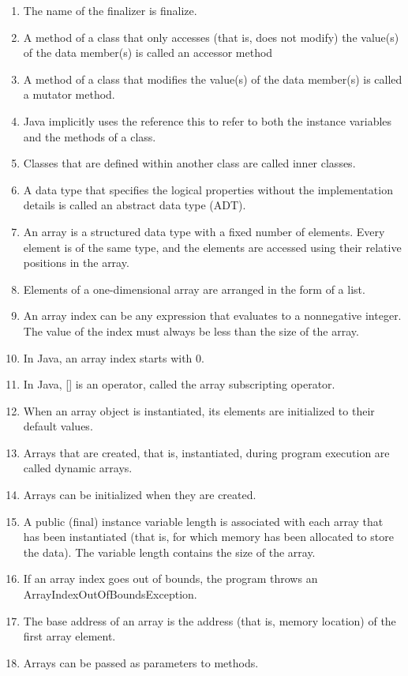 \documentclass[12pt,a4paper,final,twoside,onecolumn,titlepage]{book}
\begin{document}
\begin{enumerate}
\item The name of the finalizer is finalize.
\item A method of a class that only accesses (that is, does not modify) the value(s) of the data member(s) is called an accessor method
\item A method of a class that modifies the value(s) of the data member(s) is called a mutator method.
\item  Java implicitly uses the reference this to refer to both the instance variables and the methods of a class.
\item Classes that are defined within another class are called inner classes.
\item A data type that specifies the logical properties without the implementation details is called an abstract data type (ADT).
\item An array is a structured data type with a fixed number of elements. Every element is of the same type, and the elements are accessed using their relative positions in the array.
\item Elements of a one-dimensional array are arranged in the form of a list.
\item An array index can be any expression that evaluates to a nonnegative integer. The value of the index must always be less than the size of the array.
\item In Java, an array index starts with 0.
\item In Java, [] is an operator, called the array subscripting operator.
\item When an array object is instantiated, its elements are initialized to their default values.
\item Arrays that are created, that is, instantiated, during program execution are called dynamic arrays.
\item Arrays can be initialized when they are created.
\item A public (final) instance variable length is associated with each array that has been instantiated (that is, for which memory has been allocated to store the data). The variable length contains the size of the array.
\item If an array index goes out of bounds, the program throws an ArrayIndexOutOfBoundsException.
\item The base address of an array is the address (that is, memory location) of the first array element.
\item Arrays can be passed as parameters to methods.

\end{enumerate}
\end{document}

